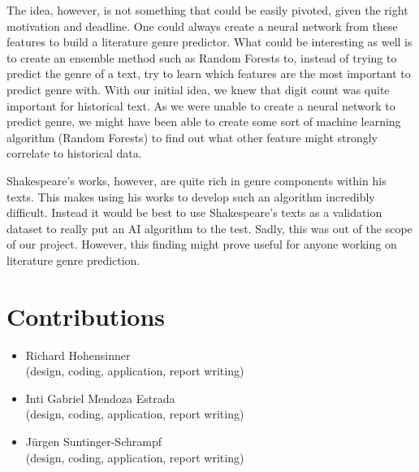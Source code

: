 \documentclass[runningheads]{llncs}
\begin{document}
The idea, however, is not something that could be easily pivoted, given the right motivation and deadline. One could always create a neural network from these features to build a literature genre predictor. What could be interesting as well is to create an ensemble method such as Random Forests to, instead of trying to predict the genre of a text, try to learn which features are the most important to predict genre with. With our initial idea, we knew that digit count was quite important for historical text. As we were unable to create a neural network to predict genre, we might have been able to create some sort of machine learning algorithm (Random Forests) to find out what other feature might strongly correlate to historical data. 

Shakespeare's works, however, are quite rich in genre components within his texts. This makes using his works to develop such an algorithm incredibly difficult. Instead it would be best to use Shakespeare's texts as a validation dataset to really put an AI algorithm to the test. Sadly, this was out of the scope of our project. However, this finding might prove useful for anyone working on literature genre prediction.
\section{Contributions}
\begin{itemize}
  \item Richard Hohensinner \\ (design, coding, application, report writing)
  \item Inti Gabriel Mendoza Estrada \\ (design, coding, application, report writing)
  \item Jürgen Suntinger-Schrampf \\ (design, coding, application, report writing)
\end{itemize}







\end{document}
